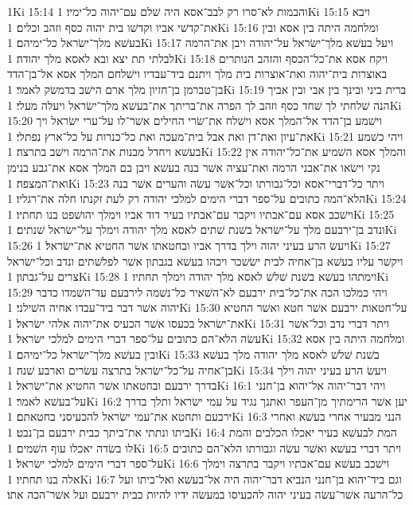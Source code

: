 1Ki 15:14  והבמות לא־סרו רק לבב־אסא היה שׁלם עם־יהוה כל־ימיו׃
1Ki 15:15  ויבא את־קדשׁי אביו וקדשׁו בית יהוה כסף וזהב וכלים׃
1Ki 15:16  ומלחמה היתה בין אסא ובין בעשׁא מלך־ישׂראל כל־ימיהם׃
1Ki 15:17  ויעל בעשׁא מלך־ישׂראל על־יהודה ויבן את־הרמה לבלתי תת יצא ובא לאסא מלך יהודה׃
1Ki 15:18  ויקח אסא את־כל־הכסף והזהב הנותרים באוצרות בית־יהוה ואת־אוצרות בית מלך ויתנם ביד־עבדיו וישׁלחם המלך אסא אל־בן־הדד בן־טברמן בן־חזיון מלך ארם הישׁב בדמשׂק לאמר׃
1Ki 15:19  ברית ביני ובינך בין אבי ובין אביך הנה שׁלחתי לך שׁחד כסף וזהב לך הפרה את־בריתך את־בעשׁא מלך־ישׂראל ויעלה מעלי׃
1Ki 15:20  וישׁמע בן־הדד אל־המלך אסא וישׁלח את־שׂרי החילים אשׁר־לו על־ערי ישׂראל ויך את־עיון ואת־דן ואת אבל בית־מעכה ואת כל־כנרות על כל־ארץ נפתלי׃
1Ki 15:21  ויהי כשׁמע בעשׁא ויחדל מבנות את־הרמה וישׁב בתרצה׃
1Ki 15:22  והמלך אסא השׁמיע את־כל־יהודה אין נקי וישׂאו את־אבני הרמה ואת־עציה אשׁר בנה בעשׁא ויבן בם המלך אסא את־גבע בנימן ואת־המצפה׃
1Ki 15:23  ויתר כל־דברי־אסא וכל־גבורתו וכל־אשׁר עשׂה והערים אשׁר בנה הלא־המה כתובים על־ספר דברי הימים למלכי יהודה רק לעת זקנתו חלה את־רגליו׃
1Ki 15:24  וישׁכב אסא עם־אבתיו ויקבר עם־אבתיו בעיר דוד אביו וימלך יהושׁפט בנו תחתיו׃
1Ki 15:25  ונדב בן־ירבעם מלך על־ישׂראל בשׁנת שׁתים לאסא מלך יהודה וימלך על־ישׂראל שׁנתים׃
1Ki 15:26  ויעשׂ הרע בעיני יהוה וילך בדרך אביו ובחטאתו אשׁר החטיא את־ישׂראל׃
1Ki 15:27  ויקשׁר עליו בעשׁא בן־אחיה לבית ישׂשכר ויכהו בעשׁא בגבתון אשׁר לפלשׁתים ונדב וכל־ישׂראל צרים על־גבתון׃
1Ki 15:28  וימתהו בעשׁא בשׁנת שׁלשׁ לאסא מלך יהודה וימלך תחתיו׃
1Ki 15:29  ויהי כמלכו הכה את־כל־בית ירבעם לא־השׁאיר כל־נשׁמה לירבעם עד־השׁמדו כדבר יהוה אשׁר דבר ביד־עבדו אחיה השׁילני׃
1Ki 15:30  על־חטאות ירבעם אשׁר חטא ואשׁר החטיא את־ישׂראל בכעסו אשׁר הכעיס את־יהוה אלהי ישׂראל׃
1Ki 15:31  ויתר דברי נדב וכל־אשׁר עשׂה הלא־הם כתובים על־ספר דברי הימים למלכי ישׂראל׃
1Ki 15:32  ומלחמה היתה בין אסא ובין בעשׁא מלך־ישׂראל כל־ימיהם׃
1Ki 15:33  בשׁנת שׁלשׁ לאסא מלך יהודה מלך בעשׁא בן־אחיה על־כל־ישׂראל בתרצה עשׂרים וארבע שׁנה׃
1Ki 15:34  ויעשׂ הרע בעיני יהוה וילך בדרך ירבעם ובחטאתו אשׁר החטיא את־ישׂראל׃
1Ki 16:1  ויהי דבר־יהוה אל־יהוא בן־חנני על־בעשׁא לאמר׃
1Ki 16:2  יען אשׁר הרימתיך מן־העפר ואתנך נגיד על עמי ישׂראל ותלך בדרך ירבעם ותחטא את־עמי ישׂראל להכעיסני בחטאתם׃
1Ki 16:3  הנני מבעיר אחרי בעשׁא ואחרי ביתו ונתתי את־ביתך כבית ירבעם בן־נבט׃
1Ki 16:4  המת לבעשׁא בעיר יאכלו הכלבים והמת לו בשׂדה יאכלו עוף השׁמים׃
1Ki 16:5  ויתר דברי בעשׁא ואשׁר עשׂה וגבורתו הלא־הם כתובים על־ספר דברי הימים למלכי ישׂראל׃
1Ki 16:6  וישׁכב בעשׁא עם־אבתיו ויקבר בתרצה וימלך אלה בנו תחתיו׃
1Ki 16:7  וגם ביד־יהוא בן־חנני הנביא דבר־יהוה היה אל־בעשׁא ואל־ביתו ועל כל־הרעה אשׁר־עשׂה בעיני יהוה להכעיסו במעשׂה ידיו להיות כבית ירבעם ועל אשׁר־הכה אתו׃
